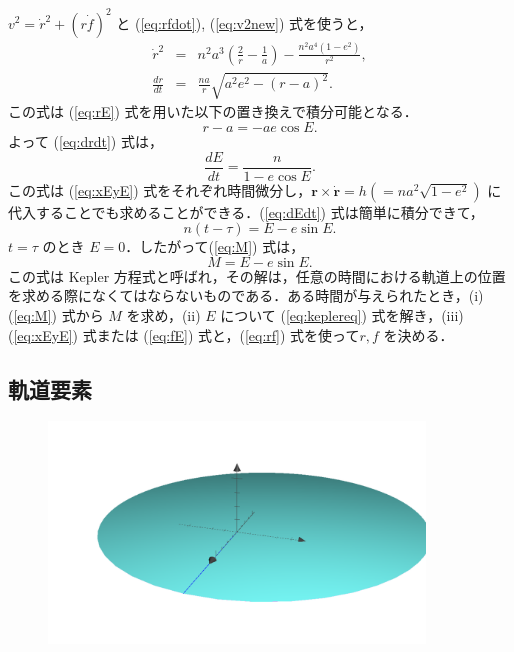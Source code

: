 \documentclass[11pt,a4paper,oneside,onecolumn]{jarticle}
\begin{document}
$v^2 = \dot{r}^2 + (r \dot{f})^2$ と (\ref{eq:rfdot}), (\ref{eq:v2new}) 式を使うと，
\begin{eqnarray}
\dot{r}^2 & = & n^2 a^3 \left( \frac{2}{r} - \frac{1}{a} \right) - \frac{n^2 a^4 (1 - e^2)}{r^2}, \\
\frac{dr}{dt} & = & \frac{na}{r} \sqrt{a^2 e^2 - (r - a)^2}. \label{eq:drdt}
\end{eqnarray}
この式は (\ref{eq:rE}) 式を用いた以下の置き換えで積分可能となる．
\begin{equation}
r - a = - a e \cos E.
\end{equation}
よって (\ref{eq:drdt}) 式は，
\begin{equation}
\frac{dE}{dt} = \frac{n}{1 - e \cos E}. \label{eq:dEdt}
\end{equation}
この式は (\ref{eq:xEyE}) 式をそれぞれ時間微分し，${\bm r} \times \dot{{\bm r}} = h ( = n a^2 \sqrt{1 - e^2} )$ に代入することでも求めることができる．(\ref{eq:dEdt}) 式は簡単に積分できて，
\begin{equation}
n (t - \tau) = E - e \sin E.
\end{equation}
$t = \tau$ のとき $E = 0$．したがって(\ref{eq:M}) 式は，
\begin{equation}
M = E - e \sin E. \label{eq:keplereq}
\end{equation}
この式は Kepler 方程式と呼ばれ，その解は，任意の時間における軌道上の位置を求める際になくてはならないものである．ある時間が与えられたとき，(i) (\ref{eq:M}) 式から $M$ を求め，(ii) $E$ について (\ref{eq:keplereq}) 式を解き，(iii) (\ref{eq:xEyE}) 式または (\ref{eq:fE}) 式と，(\ref{eq:rf}) 式を使って$r, f$ を決める．

\subsection{軌道要素}

\begin{figure}[H]
\centering
\includegraphics[width=10cm]{./image/ellipse1.pdf}
\caption{\label{}}
\end{figure}
\end{document}
